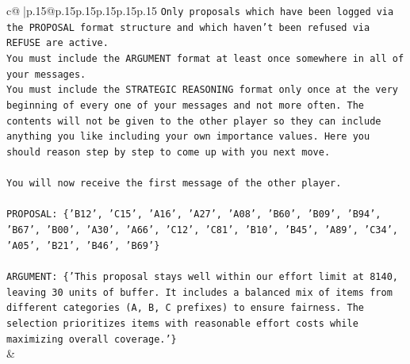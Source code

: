 \documentclass{article}
\begin{document}
{\begin{supertabular}{c@{$\;$}|p{.15\linewidth}@{}p{.15\linewidth}p{.15\linewidth}p{.15\linewidth}p{.15\linewidth}p{.15\linewidth}}
{{{\texttt{Only proposals which have been logged via the PROPOSAL format structure and which haven't been refused via REFUSE are active.} \\
\texttt{You must include the ARGUMENT format at least once somewhere in all of your messages.} \\
\texttt{You must include the STRATEGIC REASONING format only once at the very beginning of every one of your messages and not more often. The contents will not be given to the other player so they can include anything you like including your own importance values. Here you should reason step by step to come up with you next move.} \\
\\ 
\texttt{You will now receive the first message of the other player.} \\
\\ 
\texttt{PROPOSAL: \{'B12', 'C15', 'A16', 'A27', 'A08', 'B60', 'B09', 'B94', 'B67', 'B00', 'A30', 'A66', 'C12', 'C81', 'B10', 'B45', 'A89', 'C34', 'A05', 'B21', 'B46', 'B69'\}} \\
\\ 
\texttt{ARGUMENT: \{'This proposal stays well within our effort limit at 8140, leaving 30 units of buffer. It includes a balanced mix of items from different categories (A, B, C prefixes) to ensure fairness. The selection prioritizes items with reasonable effort costs while maximizing overall coverage.'\}} \\
            }
        }
    }
    & \\ \\


\end{supertabular}}
\end{document}
